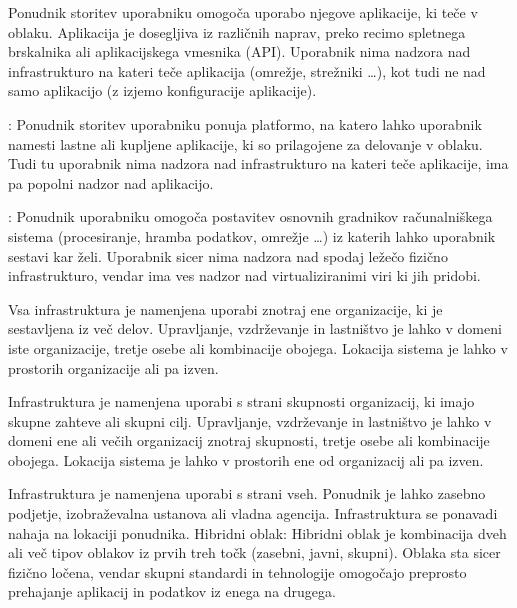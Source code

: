 \documentclass[12pt,a4paper,openany]{book}
\begin{document}
\begin{description}[style=nextline]
	\item[\gls{SaaS}] Ponudnik storitev uporabniku omogoča uporabo njegove aplikacije, ki teče v oblaku. Aplikacija je dosegljiva iz različnih naprav, preko recimo spletnega brskalnika ali aplikacijskega vmesnika (\gls{API}). Uporabnik nima nadzora nad infrastrukturo na kateri teče aplikacija (omrežje, strežniki …), kot tudi ne nad samo aplikacijo (z izjemo konfiguracije aplikacije).
	
	\item[\gls{PaaS}]: Ponudnik storitev uporabniku ponuja platformo, na katero lahko uporabnik namesti lastne ali kupljene aplikacije, ki so prilagojene za delovanje v oblaku. Tudi tu uporabnik nima nadzora nad infrastrukturo na kateri teče aplikacije, ima pa popolni nadzor nad aplikacijo.
	
	\item[\gls{IaaS}]: Ponudnik uporabniku omogoča postavitev osnovnih gradnikov računalniškega sistema (procesiranje, hramba podatkov, omrežje …) iz katerih lahko uporabnik sestavi kar želi. Uporabnik sicer nima nadzora nad spodaj ležečo fizično infrastrukturo, vendar ima ves nadzor nad virtualiziranimi viri ki jih pridobi.
\end{description}

\begin{description}[style=nextline]
	\item[Zasebni oblak] Vsa infrastruktura je namenjena uporabi znotraj ene organizacije, ki je sestavljena iz več delov. Upravljanje, vzdrževanje in lastništvo je lahko v domeni iste organizacije, tretje osebe ali kombinacije obojega. Lokacija sistema je lahko v prostorih organizacije ali pa izven.

	\item[Skupni oblak] Infrastruktura je namenjena uporabi s strani skupnosti organizacij, ki imajo skupne zahteve ali skupni cilj. Upravljanje, vzdrževanje in lastništvo je lahko v domeni ene ali večih organizacij znotraj skupnosti, tretje osebe ali kombinacije obojega. Lokacija sistema je lahko v prostorih ene od organizacij ali pa izven.

	\item[Javni oblak] Infrastruktura je namenjena uporabi s strani vseh. Ponudnik je lahko zasebno podjetje, izobraževalna ustanova ali vladna agencija. Infrastruktura se ponavadi nahaja na lokaciji ponudnika.
	Hibridni oblak: Hibridni oblak je kombinacija dveh ali več tipov oblakov iz prvih treh točk (zasebni, javni, skupni). Oblaka sta sicer fizično ločena, vendar skupni standardi in tehnologije omogočajo preprosto prehajanje aplikacij in podatkov iz enega na drugega.
\end{description}
\end{document}
